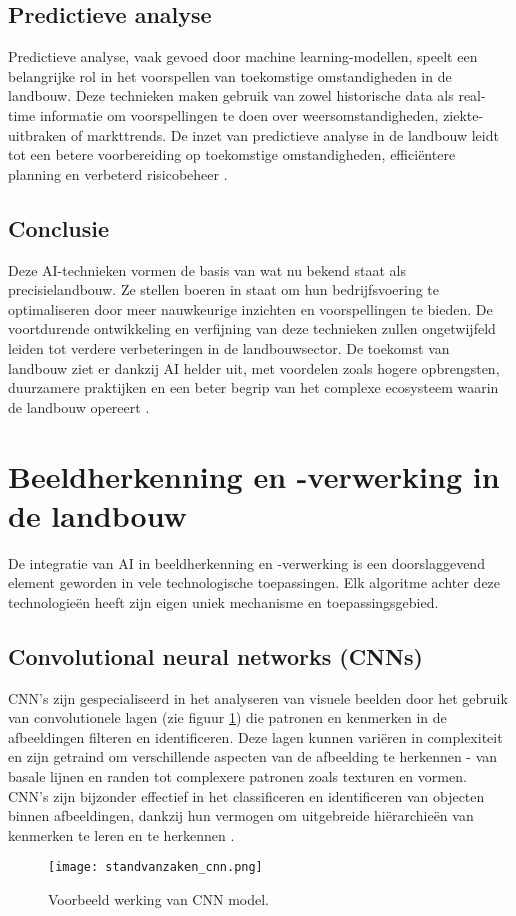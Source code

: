 \subsection{Predictieve analyse}
Predictieve analyse, vaak gevoed door machine learning-modellen, speelt een belangrijke rol in het voorspellen van toekomstige omstandigheden in de landbouw. Deze technieken maken gebruik van zowel historische data als real-time informatie om voorspellingen te doen over weersomstandigheden, ziekte-uitbraken of markttrends. De inzet van predictieve analyse in de landbouw leidt tot een betere voorbereiding op toekomstige omstandigheden, efficiëntere planning en verbeterd risicobeheer \autocite{akhter2022precision}.
\subsection{Conclusie}
Deze AI-technieken vormen de basis van wat nu bekend staat als precisielandbouw. Ze stellen boeren in staat om hun bedrijfsvoering te optimaliseren door meer nauwkeurige inzichten en voorspellingen te bieden. De voortdurende ontwikkeling en verfijning van deze technieken zullen ongetwijfeld leiden tot verdere verbeteringen in de landbouwsector. De toekomst van landbouw ziet er dankzij AI helder uit, met voordelen zoals hogere opbrengsten, duurzamere praktijken en een beter begrip van het complexe ecosysteem waarin de landbouw opereert \autocite{bhat2021big}.

\section{Beeldherkenning en -verwerking in de landbouw}
De integratie van AI in beeldherkenning en -verwerking is een doorslaggevend element geworden in vele technologische toepassingen. Elk algoritme achter deze technologieën heeft zijn eigen uniek mechanisme en toepassingsgebied.

\subsection{Convolutional neural networks (CNNs)}
CNN's zijn gespecialiseerd in het analyseren van visuele beelden door het gebruik van convolutionele lagen (zie figuur \ref{fig:standvanzaken_cnn}) die patronen en kenmerken in de afbeeldingen filteren en identificeren. Deze lagen kunnen variëren in complexiteit en zijn getraind om verschillende aspecten van de afbeelding te herkennen - van basale lijnen en randen tot complexere patronen zoals texturen en vormen. CNN's zijn bijzonder effectief in het classificeren en identificeren van objecten binnen afbeeldingen, dankzij hun vermogen om uitgebreide hiërarchieën van kenmerken te leren en te herkennen \autocite{sharma2018analysis}.
\newline
\begin{figure}[H]
  \centering
  \texttt{[image: standvanzaken\_cnn.png]}
  \caption{Voorbeeld werking van CNN model. \cite{birdcnnimage2021}}
  \label{fig:standvanzaken_cnn}  
\end{figure}
\newline
